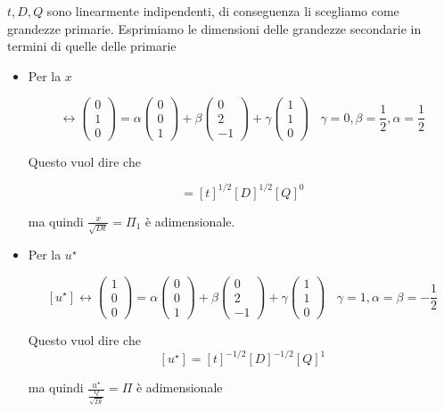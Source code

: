 \documentclass[10pt,a4paper,twoside,openright]{book}
\begin{document}
$t,D,Q$ sono linearmente indipendenti, di conseguenza li scegliamo come grandezze primarie. Esprimiamo le dimensioni delle grandezze secondarie in termini di quelle delle primarie
\begin{itemize}
\item Per la $x$

\begin{equation*}
[ x] \leftrightarrow \begin{pmatrix}
0\\
1\\
0
\end{pmatrix} =\alpha \begin{pmatrix}
0\\
0\\
1
\end{pmatrix} +\beta \begin{pmatrix}
0\\
2\\
-1
\end{pmatrix} +\gamma \begin{pmatrix}
1\\
1\\
0
\end{pmatrix} \ \ \ \ \gamma =0,\beta =\frac{1}{2},\alpha =\frac{1}{2}
\end{equation*}

Questo vuol dire che

\begin{equation*}
[ x] =[ t]^{1/2}[ D]^{1/2}[ Q]^{0}
\end{equation*}

ma quindi $\frac{x}{\sqrt{Dt}} =\Pi _{1}$ è adimensionale.
\item Per la $u^{\star }$

\begin{equation*}
\left[ u^{\star }\right] \leftrightarrow \begin{pmatrix}
1\\
0\\
0
\end{pmatrix} =\alpha \begin{pmatrix}
0\\
0\\
1
\end{pmatrix} +\beta \begin{pmatrix}
0\\
2\\
-1
\end{pmatrix} +\gamma \begin{pmatrix}
1\\
1\\
0
\end{pmatrix} \ \ \ \ \gamma =1,\alpha =\beta =-\frac{1}{2}
\end{equation*}

Questo vuol dire che
\begin{equation*}
\left[ u^{\star }\right] =[ t]^{-1/2}[ D]^{-1/2}[ Q]^{1}
\end{equation*}

ma quindi $\frac{u^{\star }}{\frac{Q}{\sqrt{Dt}}} =\Pi $ è adimensionale
\end{itemize}
\end{document}
